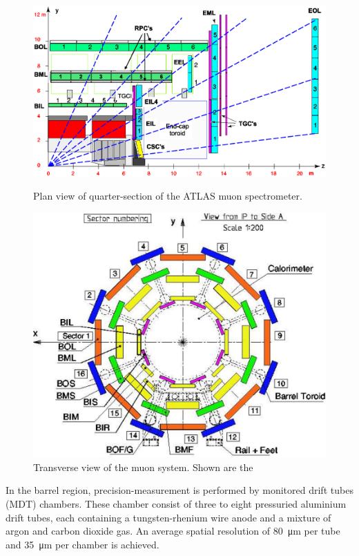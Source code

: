 \begin{figure}[tbhp]
  \centering
  \begin{minipage}[b]{0.47\textwidth}
    \includegraphics[width=\textwidth]{PartDetector/Diagrams/Muon_section.eps}
  \caption{Plan view of quarter-section of the ATLAS muon spectrometer.} \label{fig:DetectorMuonOverview}
  \end{minipage}
  \hfill
  \begin{minipage}[b]{0.47\textwidth}
   \includegraphics[width=\textwidth]{PartDetector/Diagrams/Muon_sector_numbering.pdf}
  \caption{Transverse view of the muon system. Shown are the } \label{fig:DetectorTransverse}
  \end{minipage}
\end{figure}

In the barrel region, precision-measurement is performed by monitored drift tubes (MDT) chambers. These chamber consist of three to eight pressuried aluminium drift tubes, each containing a tungsten-rhenium wire anode and a mixture of argon and carbon dioxide gas. An average spatial resolution of \SI{80}{\um} per tube and \SI{35}{\um} per chamber is achieved.

